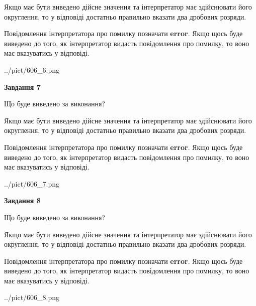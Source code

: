 \documentclass[12pt, ukrainian]{article}
\begin{document}
{\begin {Large}
Якщо має бути виведено дійсне значення та інтерпретатор має здійснювати його округлення, 
то у відповіді достатньо правильно вказати два дробових розряди.

Повідомлення інтерпретатора про помилку позначати \textbf{error}.
Якщо щось буде виведено до того, як інтерпретатор видасть повідомлення про помилку, 
то воно має вказуватись у відповіді. \par

\begin{center}
	{../pict/606_6.png}
\end{center}
\newpage

{\begin {center}\textbf{Завдання 7}\end {center}}\par
Що буде виведено за виконання? \par

Якщо має бути виведено дійсне значення та інтерпретатор має здійснювати його округлення, 
то у відповіді достатньо правильно вказати два дробових розряди.

Повідомлення інтерпретатора про помилку позначати \textbf{error}.
Якщо щось буде виведено до того, як інтерпретатор видасть повідомлення про помилку, 
то воно має вказуватись у відповіді. \par

\begin{center}
	{../pict/606_7.png}
\end{center}
\newpage

{\begin {center}\textbf{Завдання 8}\end {center}}\par
Що буде виведено за виконання? \par

Якщо має бути виведено дійсне значення та інтерпретатор має здійснювати його округлення, 
то у відповіді достатньо правильно вказати два дробових розряди.

Повідомлення інтерпретатора про помилку позначати \textbf{error}.
Якщо щось буде виведено до того, як інтерпретатор видасть повідомлення про помилку, 
то воно має вказуватись у відповіді. \par

\begin{center}
	{../pict/606_8.png}
\end{center}
\newpage


\end{Large}}
\end{document}
